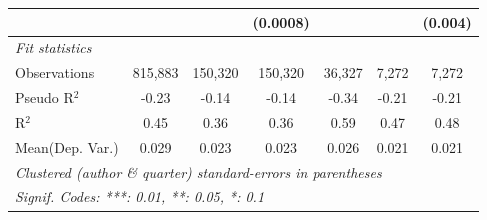 \begin{tabular}{lcccccc}
                           &               &          & (0.0008)     &         &         & (0.004)\\   
   \midrule
   \emph{Fit statistics}\\
   Observations            & 815,883       & 150,320  & 150,320      & 36,327  & 7,272   & 7,272\\  
   Pseudo R$^2$            & -0.23         & -0.14    & -0.14        & -0.34   & -0.21   & -0.21\\  
   R$^2$                   & 0.45          & 0.36     & 0.36         & 0.59    & 0.47    & 0.48\\  
Mean(Dep. Var.) & 0.029 & 0.023 & 0.023 & 0.026 & 0.021 & 0.021 \\
   \midrule \midrule
   \multicolumn{7}{l}{\emph{Clustered (author \& quarter) standard-errors in parentheses}}\\
   \multicolumn{7}{l}{\emph{Signif. Codes: ***: 0.01, **: 0.05, *: 0.1}}\\
\end{tabular}
\par\endgroup
